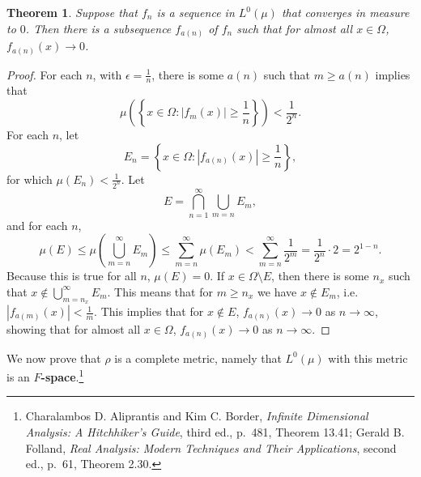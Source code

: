\documentclass{article}
\newtheorem{theorem}{Theorem}
\theoremstyle{definition}
\begin{document}
\begin{theorem}
Suppose that $f_n$ is a sequence in $L^0(\mu)$ that converges in measure to $0$.
Then there is a subsequence $f_{a(n)}$ of $f_n$ such that for almost all
$x \in \Omega$, $f_{a(n)}(x) \to 0$.
\end{theorem}
\begin{proof}
For each $n$,
with $\epsilon=\frac{1}{n}$,
there is some $a(n)$ such that
$m \geq a(n)$ implies that
\[
\mu\left(\left\{x \in \Omega: |f_m(x)| \geq \frac{1}{n}\right\}\right)<
\frac{1}{2^n}.
\]
For each $n$, let
\[
E_n = \left\{x \in \Omega: |f_{a(n)}(x)| \geq \frac{1}{n} \right\},
\]
for which $\mu(E_n)<\frac{1}{2^n}$. 
Let
\[
E = \bigcap_{n=1}^\infty \bigcup_{m=n} E_m,
\]
and for each $n$,
\[
\mu(E) \leq \mu \left( \bigcup_{m=n}^\infty E_m \right) 
\leq \sum_{m=n}^\infty \mu(E_m) < \sum_{m=n}^\infty \frac{1}{2^m} =  
\frac{1}{2^n} \cdot 2 = 2^{1-n}.
\]
Because this is true for all $n$, $\mu(E)=0$. If
$x \in \Omega \setminus E$, then there is some $n_x$ such that
$x \not \in \bigcup_{m=n_x}^\infty E_m$. This means that
for $m \geq n_x$ we have $x \not \in E_m$, i.e.
$|f_{a(m)}(x)|<\frac{1}{m}$. This implies that for
$x \not \in E$, 
$f_{a(n)}(x) \to 0$ as $n \to \infty$, showing that
for almost all $x \in \Omega$, $f_{a(n)}(x) \to 0$ as
$n \to \infty$. 
\end{proof}


We now prove that
$\rho$ is a complete metric, namely that $L^0(\mu)$ with this metric is an \textbf{$F$-space}.\footnote{Charalambos D. 
Aliprantis and Kim C. Border, {\em Infinite Dimensional Analysis: A Hitchhiker's Guide}, third ed., p.~481,
Theorem 13.41;
Gerald B. Folland, {\em Real Analysis: Modern Techniques and Their Applications}, second ed., p.~61, Theorem 2.30.} 
\end{document}
